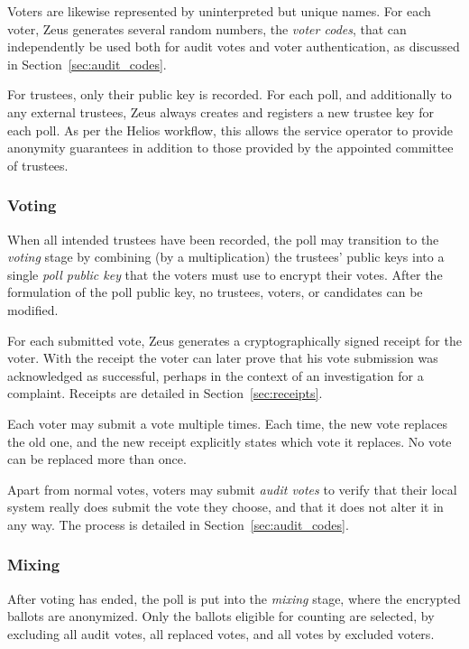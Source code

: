 \documentclass[letterpaper,10pt]{article}
\begin{document}
Voters are likewise represented by uninterpreted but unique names.
For each voter,
Zeus generates several random numbers, the \emph{voter codes}, that can
independently be used both for audit votes and voter authentication,
as discussed in Section~\ref{sec:audit_codes}.

For trustees, only their public key is recorded.
For each poll, and additionally to any external trustees,
Zeus always creates and registers a new trustee key for each poll.
As per the Helios workflow, this allows the service operator to
provide anonymity guarantees in addition to those provided by
the appointed committee of trustees.

\subsubsection{Voting}
\label{sec:voting}
When all intended trustees have been recorded,
the poll may transition to the \emph{voting} stage
by combining (by a multiplication)
the trustees' public keys into a single \emph{poll public key}
that the voters must use to encrypt their votes.
After the formulation of the poll public key,
no trustees, voters, or candidates can be modified.

For each submitted vote, Zeus generates a cryptographically signed
receipt for the voter.
With the receipt the voter can later prove that
his vote submission was acknowledged as successful,
perhaps in the context of an investigation for a complaint.
Receipts are detailed in Section~\ref{sec:receipts}.

Each voter may submit a vote multiple times.
Each time, the new vote replaces the old one,
and the new receipt explicitly states which vote it replaces.
No vote can be replaced more than once.

Apart from normal votes, voters may submit \emph{audit votes} to verify
that their local system really does submit the vote they choose,
and that it does not alter it in any way.
The process is detailed in Section~\ref{sec:audit_codes}.

\subsubsection{Mixing}
\label{sec:mixing}
After voting has ended, the poll is put into the \emph{mixing} stage,
where the encrypted ballots are anonymized.
Only the ballots eligible for counting are selected, by excluding
all audit votes, all replaced votes, and all votes by excluded voters.
\end{document}
